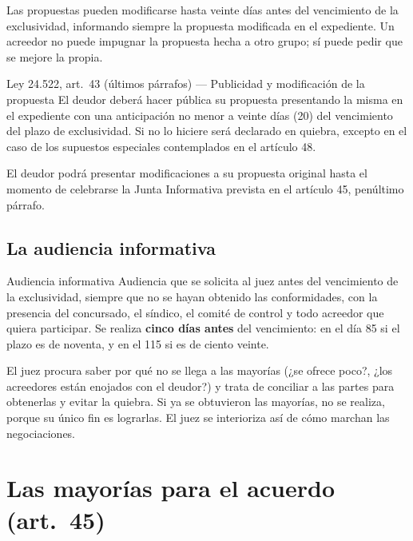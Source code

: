 \documentclass[12pt,oneside]{book}
\begin{document}
Las propuestas pueden modificarse hasta veinte días antes del vencimiento de la exclusividad, informando siempre la propuesta modificada en el expediente.
Un acreedor no puede impugnar la propuesta hecha a otro grupo; sí puede pedir que se mejore la propia.

\begin{norma}{Ley 24.522, art.\ 43 (últimos párrafos) --- Publicidad y modificación de la propuesta}
El deudor deberá hacer pública su propuesta presentando la misma en el expediente con una anticipación no menor a veinte días (20) del vencimiento del plazo de exclusividad. Si no lo hiciere será declarado en quiebra, excepto en el caso de los supuestos especiales contemplados en el artículo 48.

El deudor podrá presentar modificaciones a su propuesta original hasta el momento de celebrarse la Junta Informativa prevista en el artículo 45, penúltimo párrafo.
\end{norma}

\subsection{La audiencia informativa}

\begin{definition}{Audiencia informativa}
Audiencia que se solicita al juez antes del vencimiento de la exclusividad, siempre que no se hayan obtenido las conformidades, con la presencia del concursado, el síndico, el comité de control y todo acreedor que quiera participar. Se realiza \textbf{cinco días antes} del vencimiento: en el día 85 si el plazo es de noventa, y en el 115 si es de ciento veinte.
\end{definition}

El juez procura saber por qué no se llega a las mayorías (¿se ofrece poco?, ¿los acreedores están enojados con el deudor?) y trata de conciliar a las partes para obtenerlas y evitar la quiebra. Si ya se obtuvieron las mayorías, no se realiza, porque su único fin es lograrlas. El juez se interioriza así de cómo marchan las negociaciones.

\section{Las mayorías para el acuerdo (art.\ 45)}
\end{document}
